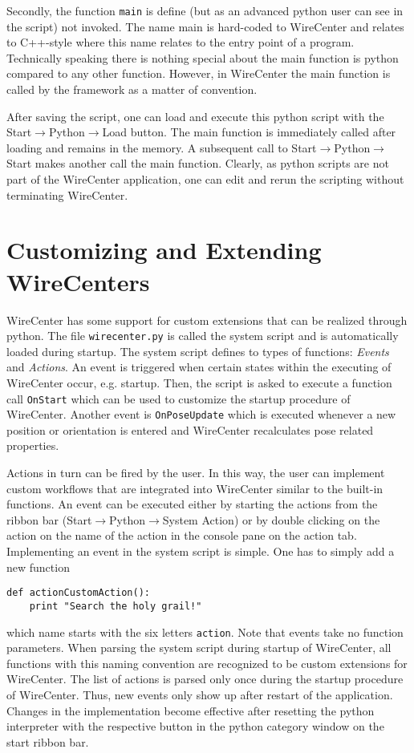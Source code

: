 \documentclass[11pt,a4paper,onepage,openany]{book}
\begin{document}
Secondly, the function \texttt{\texttt{main}} is define (but as an advanced python user can see in the script) not invoked. The name main is hard-coded to WireCenter and relates to C++-style where this name relates to the entry point of a program. Technically speaking there is nothing special about the main function is python compared to any other function. However, in WireCenter the main function is called by the framework as a matter of convention.

After saving the script, one can load and execute this python script with the Start$\rightarrow$Python$\rightarrow$Load button. The main function is immediately called after loading and remains in the memory. A subsequent call to Start$\rightarrow$Python$\rightarrow$Start makes another call the main function. Clearly, as python scripts are not part of the WireCenter application, one can edit and rerun the scripting without terminating WireCenter.

\section{Customizing and Extending WireCenters}
WireCenter has some support for custom extensions that can be realized through python. The file \texttt{wirecenter.py} is called the system script and is automatically loaded during startup. The system script defines to types of functions: \emph{Events} and \emph{Actions}. An event is triggered when certain states within the executing of WireCenter occur, e.g. startup. Then, the script is asked to execute a function call \texttt{OnStart} which can be used to customize the startup procedure of WireCenter. Another event is \texttt{OnPoseUpdate} which is executed whenever a new position or orientation is entered and WireCenter recalculates pose related properties.

Actions in turn can be fired by the user. In this way, the user can implement custom workflows that are integrated into WireCenter similar to the built-in functions. An event can be executed either by starting the actions from the ribbon bar (Start$\rightarrow$Python$\rightarrow$System Action) or by double clicking on the action on the name of the action in the console pane on the action tab. Implementing an event in the system script is simple. One has to simply add a new function
\begin{verbatim}
def actionCustomAction():
    print "Search the holy grail!"
\end{verbatim}
which name starts with the six letters \texttt{action}. Note that events take no function parameters. When parsing the system script during startup of WireCenter, all functions with this naming convention are recognized to be custom extensions for WireCenter. The list of actions is parsed only once during the startup procedure of WireCenter. Thus, new events only show up after restart of the application. Changes in the implementation become effective after resetting the python interpreter with the respective button in the python category window on the start ribbon bar.
\end{document}

